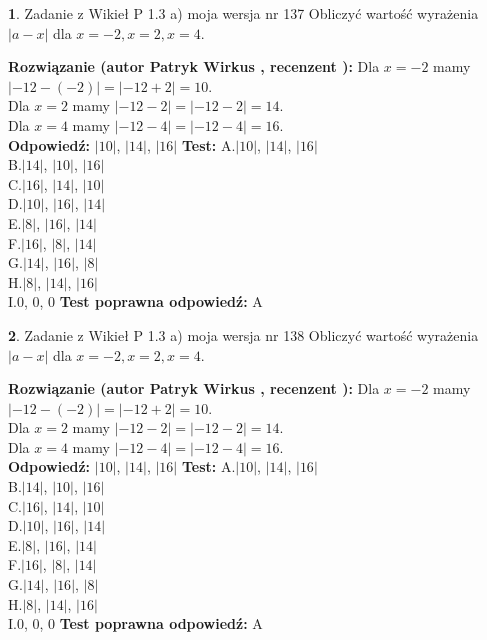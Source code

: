 \documentclass[12pt, a4paper]{article}
\theoremstyle{definition} %
\newtheorem{zad}{}
\newcommand{\zadStart}[1]{\begin{zad}#1\newline}
\newcommand{\zadStop}{\end{zad}}
\newcommand{\rozwStart}[2]{\noindent \textbf{Rozwiązanie (autor #1 , recenzent #2): }\newline}
\newcommand{\rozwStop}{\newline}
\newcommand{\odpStart}{\noindent \textbf{Odpowiedź:}\newline}
\newcommand{\odpStop}{\newline}
\newcommand{\testStart}{\noindent \textbf{Test:}\newline}
\newcommand{\testStop}{\newline}
\newcommand{\kluczStart}{\noindent \textbf{Test poprawna odpowiedź:}\newline}
\newcommand{\kluczStop}{\newline}
\begin{document}
\zadStart{Zadanie z Wikieł P 1.3 a) moja wersja nr 137}
Obliczyć wartość wyrażenia $|a - x|$ dla $x=-2,x=2,x=4$.
\zadStop
\rozwStart{Patryk Wirkus}{}
Dla $x = -2$ mamy $|-12 - (-2)| = |-12 + 2| = 10$.\\
Dla $x = 2$ mamy $|-12 - 2| = |-12 - 2| = 14$.\\
Dla $x = 4$ mamy $|-12 - 4| = |-12 - 4| = 16$.\\
\rozwStop
\odpStart
$|10|$, $|14|$, $|16|$
\odpStop
\testStart
A.$|10|$, $|14|$, $|16|$\\
B.$|14|$, $|10|$, $|16|$\\
C.$|16|$, $|14|$, $|10|$\\
D.$|10|$, $|16|$, $|14|$\\
E.$|8|$, $|16|$, $|14|$\\
F.$|16|$, $|8|$, $|14|$\\
G.$|14|$, $|16|$, $|8|$\\
H.$|8|$, $|14|$, $|16|$\\
I.$0$, $0$, $0$
\testStop
\kluczStart
A
\kluczStop



\zadStart{Zadanie z Wikieł P 1.3 a) moja wersja nr 138}
Obliczyć wartość wyrażenia $|a - x|$ dla $x=-2,x=2,x=4$.
\zadStop
\rozwStart{Patryk Wirkus}{}
Dla $x = -2$ mamy $|-12 - (-2)| = |-12 + 2| = 10$.\\
Dla $x = 2$ mamy $|-12 - 2| = |-12 - 2| = 14$.\\
Dla $x = 4$ mamy $|-12 - 4| = |-12 - 4| = 16$.\\
\rozwStop
\odpStart
$|10|$, $|14|$, $|16|$
\odpStop
\testStart
A.$|10|$, $|14|$, $|16|$\\
B.$|14|$, $|10|$, $|16|$\\
C.$|16|$, $|14|$, $|10|$\\
D.$|10|$, $|16|$, $|14|$\\
E.$|8|$, $|16|$, $|14|$\\
F.$|16|$, $|8|$, $|14|$\\
G.$|14|$, $|16|$, $|8|$\\
H.$|8|$, $|14|$, $|16|$\\
I.$0$, $0$, $0$
\testStop
\kluczStart
A
\kluczStop
\end{document}

